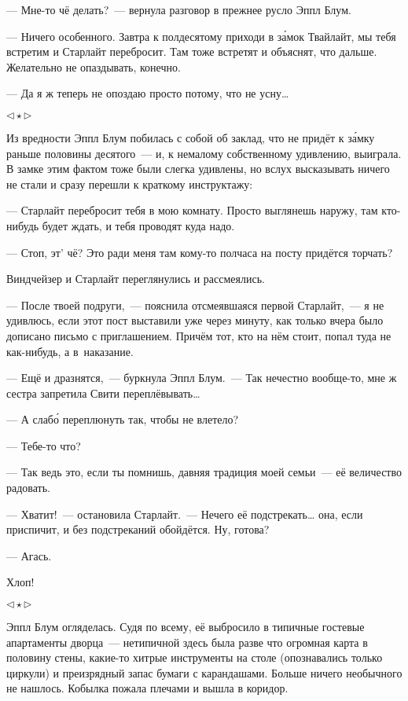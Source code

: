 \documentclass[fontsize=11pt,a5paper,titlepage=firstcover]{scrbook}
\begin{document}
--- Мне-то чё делать?~--- вернула разговор в прежнее русло Эппл Блум.

--- Ничего особенного. Завтра к полдесятому приходи в за́мок Твайлайт, мы тебя встретим и Старлайт перебросит. Там тоже встретят и объяснят, что дальше. Желательно не опаздывать, конечно.

--- Да я ж теперь не опоздаю просто потому, что не усну{\ldots}
\begin{center}$\triangleleft\star\triangleright$\end{center}

Из вредности Эппл Блум побилась с собой об заклад, что не придёт к за́мку раньше половины десятого~--- и, к немалому собственному удивлению, выиграла. В замке этим фактом тоже были слегка удивлены, но вслух высказывать ничего не стали и сразу перешли к краткому инструктажу:

--- Старлайт перебросит тебя в мою комнату. Просто выглянешь наружу, там кто-нибудь будет ждать, и тебя проводят куда надо.

--- Стоп, эт’ чё? Это ради меня там кому-то полчаса на посту придётся торчать?

Виндчейзер и Старлайт переглянулись и рассмеялись.

--- После твоей подруги,~--- пояснила отсмеявшаяся первой Старлайт,~--- я не удивлюсь, если этот пост выставили уже через минуту, как только вчера было дописано письмо с приглашением. Причём тот, кто на нём стоит, попал туда не как-нибудь, а в~наказание.

--- Ещё и дразнятся,~--- буркнула Эппл Блум.~--- Так нечестно вообще-то, мне ж сестра запретила Свити переплёвывать{\ldots}

--- А слабо́ переплюнуть так, чтобы не влетело?

--- Тебе-то что?

--- Так ведь это, если ты помнишь, давняя традиция моей семьи~--- её величество радовать.

--- Хватит!~--- остановила Старлайт.~--- Нечего её подстрекать{\ldots} она, если приспичит, и без подстреканий обойдётся. Ну, готова?

--- Агась.

Хлоп!
\begin{center}$\triangleleft\star\triangleright$\end{center}

Эппл Блум огляделась. Судя по всему, её выбросило в типичные гостевые апартаменты дворца~--- нетипичной здесь была разве что огромная карта в половину стены, какие-то хитрые инструменты на столе (опознавались только циркули) и преизрядный запас бумаги с карандашами. Больше ничего необычного не нашлось. Кобылка пожала плечами и вышла в коридор.
\end{document}
